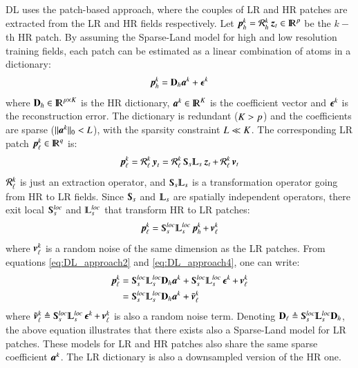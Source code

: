 DL uses the patch-based approach, where the couples of LR and HR patches are extracted from the LR and HR fields respectively. Let $ \operatorname{\mathit{\operatorname{\boldsymbol{p}}_h^{k}}} = \mathcal{R}_h^k \operatorname{\boldsymbol{z}}_t \in {\rm I\!R}^p $ be the $ k-${th} HR patch. By assuming the Sparse-Land model for high and low resolution training fields, each patch can be estimated as a linear combination of atoms in a dictionary:
\begin{equation}
\operatorname{\mathit{\operatorname{\boldsymbol{p}}_h^{k}}} = \mathbf{D}_h \boldsymbol{a}^k + \operatorname{\boldsymbol{\epsilon}}^k
\label{eq:DL_approach2}
\end{equation} 
where $ \mathbf{D}_h  \in  {\rm I\!R}^{p \times K}$ is the HR dictionary, $ \boldsymbol{a}^k \in {\rm I\!R}^K$ is the coefficient vector and $ \operatorname{\boldsymbol{\epsilon}}^k $ is the reconstruction error. The dictionary is redundant ($ K > p $) and the coefficients are sparse ($ \Arrowvert \boldsymbol{a}^k \Arrowvert_0 < L $), with the sparsity constraint $ L \ll K $. The corresponding LR patch $ \operatorname{\mathit{\operatorname{\boldsymbol{p}}_{\ell}^{k}}} \in {\rm I\!R}^q $ is: 
\begin{equation}
	\patchlow{k} = \extractlow{k} \y_t = \extractlow{k} \Sub_s\LPF_s\z_t + \extractlow{k}\mybold{v}_t
\label{eq:DL_approach3}
\end{equation}	
$ \operatorname{\mathcal{R}_{\ell}^{\mathit{k}}} $ is just an extraction operator, and $ \Sub_s\LPF_s $ is a transformation operator going from HR to LR fields. Since $ \Sub_s $ and $ \LPF_s $ are spatially independent operators, there exit local $ \Sub_s^{loc} $ and $ \LPF_s^{loc} $ that transform HR to LR patches:
\begin{equation}
	\patchlow{k} =  \Sub_s^{loc}\LPF_s^{loc}\patchhigh{k} + \mybold{v}_\ell^k
	\label{eq:DL_approach4}
\end{equation}  
where $ \operatorname{\boldsymbol{v}}_\ell^k $ is a random noise of the same dimension as the LR patches. From equations \ref{eq:DL_approach2} and \ref{eq:DL_approach4}, one can write:
\begin{equation}
\begin{split}
	\patchlow{k} &= \Sub_s^{loc}\LPF_s^{loc}\dicthigh \adictco^k + \Sub_s^{loc}\LPF_s^{loc}\mybold{\epsilon}^k + \mybold{v}_\ell^k \\
				 &= \Sub_s^{loc}\LPF_s^{loc}\dicthigh \adictco^k + \tilde{\mybold{v}}_\ell^k
\end{split}
\label{eq:DL_approach5}	
\end{equation}
where $ \tilde{\mybold{v}}_\ell^k \mydef \Sub_s^{loc}\LPF_s^{loc}\mybold{\epsilon}^k + \mybold{v}_\ell^k$ is also a random noise term. Denoting $ \dictlow \mydef \Sub_s^{loc}\LPF_s^{loc}\dicthigh  $, the above equation illustrates that there exists also a Sparse-Land model for LR patches. These models for LR and HR patches also share the same sparse coefficient $ \boldsymbol{a}^k $. The LR dictionary is also a downsampled version of the HR one.

